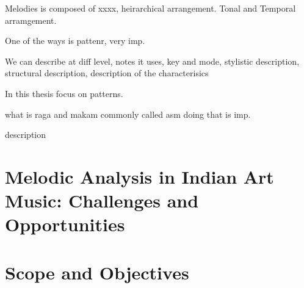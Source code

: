 Melodies is composed of xxxx, heirarchical arrangement. Tonal and Temporal arramgement. 

One of the ways is pattenr, very imp. 

We can describe at diff level, notes it uses, key and mode, stylistic description, structural description, description of the characterisics

In this thesis focus on patterns. 

what is raga and makam commonly called asm doing that is imp.

description 
\section{Melodic Analysis in Indian Art Music: Challenges and Opportunities}
\label{sec:intro_challenges_oppurtunities}

%
%

\section{Scope and Objectives}
\label{sec:intro_scope_context_relevance}

